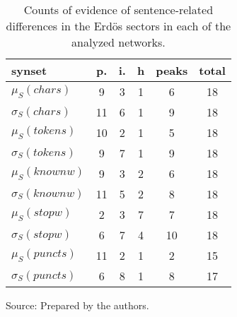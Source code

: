 \begin{table}[h!]
\begin{center}
\caption{Counts of evidence of sentence-related differences in the Erd\"os sectors in each of the analyzed networks.}
	\def\arraystretch{1.5}
\begin{tabular}{| l || c | c | c || c | c |}\hline
{\bf synset} & {\bf p.} & {\bf i.} & {\bf h} & {\bf peaks} & {\bf total} \\\hline\hline
$\mu_S(chars)$ & 9  & 3  & 1  & 6  & 18 \\
$\sigma_S(chars)$ & 11  & 6  & 1  & 9  & 18 \\\hline
$\mu_S(tokens)$ & 10  & 2  & 1  & 5  & 18 \\
$\sigma_S(tokens)$ & 9  & 7  & 1  & 9  & 18 \\\hline
$\mu_S(knownw)$ & 9  & 3  & 2  & 6  & 18 \\
$\sigma_S(knownw)$ & 11  & 5  & 2  & 8  & 18 \\\hline
$\mu_S(stopw)$ & 2  & 3  & 7  & 7  & 18 \\
$\sigma_S(stopw)$ & 6  & 7  & 4  & 10  & 18 \\\hline
$\mu_S(puncts)$ & 11  & 2  & 1  & 2  & 15 \\
$\sigma_S(puncts)$ & 6  & 8  & 1  & 8  & 17 \\\hline
\end{tabular}
\begin{flushleft}
		Source: Prepared by the authors.\
\end{flushleft}
\end{center}
\end{table}
